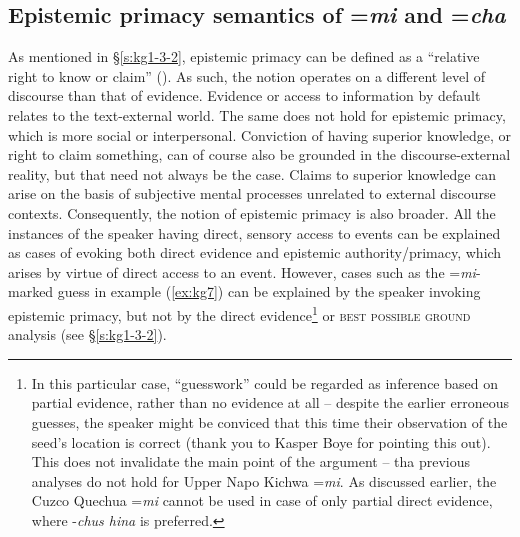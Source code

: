 \documentclass[output=paper]{langscibook}
\begin{document}
\subsection{Epistemic primacy semantics of =\textit{mi} and =\textit{cha}}\label{s:kg4-1}

As mentioned in §‎\ref{s:kg1-3-2}, epistemic primacy can be defined as a “relative right to know or claim” (\citealt{Stivers2011}). As such, the notion operates on a different level of discourse than that of evidence. Evidence or access to information by default relates to the text-external world. The same does not hold for epistemic primacy, which is more social or interpersonal. Conviction of having superior knowledge, or right to claim something, can of course also be grounded in the discourse-external reality, but that need not always be the case. Claims to superior knowledge can arise on the basis of subjective mental processes unrelated to external discourse contexts. Consequently, the notion of epistemic primacy is also broader. All the instances of the speaker having direct, sensory access to events can be explained as cases of evoking both direct evidence and epistemic authority/primacy, which arises by virtue of direct access to an event. However, cases such as the =\textit{mi}-marked guess in example ‎(\ref{ex:kg7}) can be explained by the speaker invoking epistemic primacy, but not by the direct evidence\footnote{In this particular case, “guesswork” could be regarded as inference based on partial evidence, rather than no evidence at all – despite the earlier erroneous guesses, the speaker might be conviced that this time their observation of the seed’s location is correct (thank you to Kasper Boye for pointing this out). This does not invalidate the main point of the argument – tha previous analyses do not hold for Upper Napo Kichwa =\textit{mi}. As discussed earlier, the Cuzco Quechua =\textit{mi} cannot be used in case of only partial direct evidence, where -\textit{chus hina} is preferred.} or \textsc{best possible ground} analysis (see §\ref{s:kg1-3-2}). 
\end{document}
